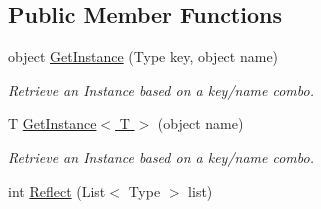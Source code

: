 \subsection*{Public Member Functions}
\begin{DoxyCompactItemize}
\item 
object \hyperlink{interfacestrange_1_1extensions_1_1injector_1_1api_1_1_i_injection_binder_aac899bd51070e8565fabab3a248cf3a5}{Get\-Instance} (Type key, object name)
\begin{DoxyCompactList}\small\item\em Retrieve an Instance based on a key/name combo. \end{DoxyCompactList}\item 
T \hyperlink{interfacestrange_1_1extensions_1_1injector_1_1api_1_1_i_injection_binder_ae9edea5e4babff105ec4767d84c6b716}{Get\-Instance$<$ T $>$} (object name)
\begin{DoxyCompactList}\small\item\em Retrieve an Instance based on a key/name combo. \end{DoxyCompactList}\item 
\hypertarget{interfacestrange_1_1extensions_1_1injector_1_1api_1_1_i_injection_binder_ac9376845ce4eefd9e2795a6899f48c25}{int \hyperlink{interfacestrange_1_1extensions_1_1injector_1_1api_1_1_i_injection_binder_ac9376845ce4eefd9e2795a6899f48c25}{Reflect} (List$<$ Type $>$ list)}\label{interfacestrange_1_1extensions_1_1injector_1_1api_1_1_i_injection_binder_ac9376845ce4eefd9e2795a6899f48c25}


\end{DoxyCompactItemize}
